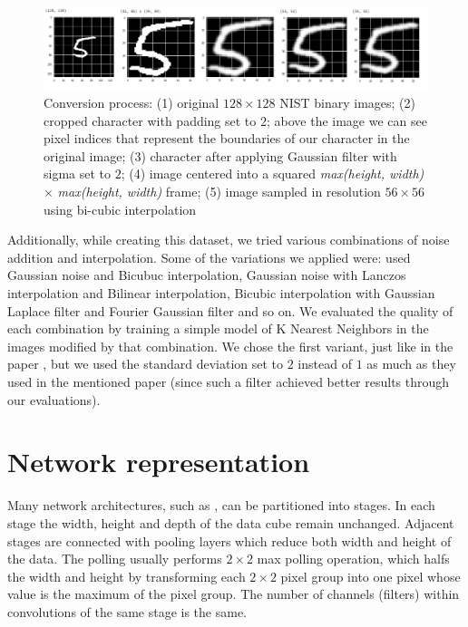 \documentclass[eng]{simposium}
\begin{document}
\begin{figure}[!ht]
  \centering
  \includegraphics[width=1\textwidth]{conversion.png}
  \caption{Conversion process: 
  (1) original $128 \times 128$ NIST binary images; 
  (2) cropped character with padding set to $2$; above the image we can see pixel indices that represent the boundaries of our character in the original image; 
  (3) character after applying Gaussian filter with sigma set to $2$; 
  (4) image centered into a squared \textit{max(height, width)} $\times$ \textit{max(height, width)} frame; 
  (5) image sampled in resolution $56 \times 56$ using bi-cubic interpolation}
  \label{fig:conversion}
\end{figure}

Additionally, while creating this dataset, we tried various combinations of noise addition and interpolation. 
Some of the variations we applied were: used Gaussian noise and Bicubuc interpolation, Gaussian noise with Lanczos interpolation 
and Bilinear interpolation, Bicubic interpolation with Gaussian Laplace filter and Fourier Gaussian filter and so on. 
We evaluated the quality of each combination by training a simple model of K Nearest Neighbors in the images modified by that 
combination. We chose the first variant, just like in the paper \cite{1}, but we used the standard deviation set to $2$ 
instead of $1$ as much as they used in the mentioned paper (since such a filter achieved better results through our evaluations). 

\section{Network representation}
\label{sec:repr}

Many network architectures, such as \cite{6}\cite{7}, can be partitioned into stages.
In each stage the width, height and depth of the data cube remain unchanged. 
Adjacent stages are connected with pooling layers which reduce both width and height of the data.
The polling usually performs $2 \times 2$ max polling operation, which halfs the width and height by transforming each $2 \times 2$ 
pixel group into one pixel whose value is the maximum of the pixel group.
The number of channels (filters) within convolutions of the same stage is the same.
\end{document}
